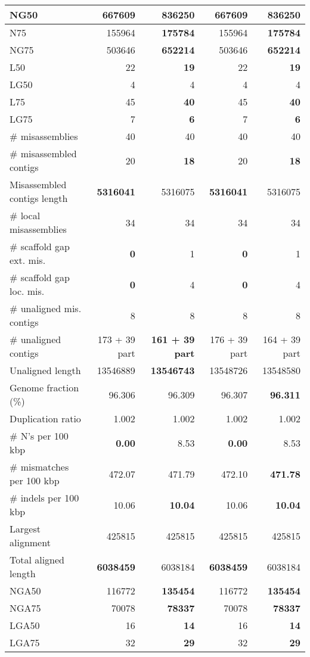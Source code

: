 \documentclass[12pt,a4paper]{article}
\begin{document}
\begin{table}[ht]
\begin{center}
\begin{tabular}{|l*{4}{|r}|}
NG50 & 667609 & {\bf 836250} & 667609 & {\bf 836250} \\ \hline
N75 & 155964 & {\bf 175784} & 155964 & {\bf 175784} \\ \hline
NG75 & 503646 & {\bf 652214} & 503646 & {\bf 652214} \\ \hline
L50 & 22 & {\bf 19} & 22 & {\bf 19} \\ \hline
LG50 & 4 & 4 & 4 & 4 \\ \hline
L75 & 45 & {\bf 40} & 45 & {\bf 40} \\ \hline
LG75 & 7 & {\bf 6} & 7 & {\bf 6} \\ \hline
\# misassemblies & 40 & 40 & 40 & 40 \\ \hline
\# misassembled contigs & 20 & {\bf 18} & 20 & {\bf 18} \\ \hline
Misassembled contigs length & {\bf 5316041} & 5316075 & {\bf 5316041} & 5316075 \\ \hline
\# local misassemblies & 34 & 34 & 34 & 34 \\ \hline
\# scaffold gap ext. mis. & {\bf 0} & 1 & {\bf 0} & 1 \\ \hline
\# scaffold gap loc. mis. & {\bf 0} & 4 & {\bf 0} & 4 \\ \hline
\# unaligned mis. contigs & 8 & 8 & 8 & 8 \\ \hline
\# unaligned contigs & 173 + 39 part & {\bf 161 + 39 part} & 176 + 39 part & 164 + 39 part \\ \hline
Unaligned length & 13546889 & {\bf 13546743} & 13548726 & 13548580 \\ \hline
Genome fraction (\%) & 96.306 & 96.309 & 96.307 & {\bf 96.311} \\ \hline
Duplication ratio & 1.002 & 1.002 & 1.002 & 1.002 \\ \hline
\# N's per 100 kbp & {\bf 0.00} & 8.53 & {\bf 0.00} & 8.53 \\ \hline
\# mismatches per 100 kbp & 472.07 & 471.79 & 472.10 & {\bf 471.78} \\ \hline
\# indels per 100 kbp & 10.06 & {\bf 10.04} & 10.06 & {\bf 10.04} \\ \hline
Largest alignment & 425815 & 425815 & 425815 & 425815 \\ \hline
Total aligned length & {\bf 6038459} & 6038184 & {\bf 6038459} & 6038184 \\ \hline
NGA50 & 116772 & {\bf 135454} & 116772 & {\bf 135454} \\ \hline
NGA75 & 70078 & {\bf 78337} & 70078 & {\bf 78337} \\ \hline
LGA50 & 16 & {\bf 14} & 16 & {\bf 14} \\ \hline
LGA75 & 32 & {\bf 29} & 32 & {\bf 29} \\ \hline
\end{tabular}
\end{center}
\end{table}
\end{document}
